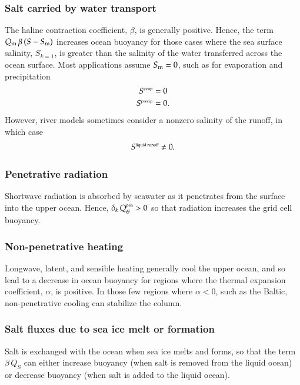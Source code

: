 \subsubsection{Salt carried by water transport}

The haline contraction coefficient, $\beta$, is generally positive.
Hence, the term $Q_{\mbox{\scriptsize m}} \, \beta \, (S - S_{\mbox{\scriptsize m}})$ increases ocean buoyancy
for those cases where the sea surface salinity, $S_{k=1}$, is greater
than the salinity of the water transferred across the ocean surface.
Most applications assume $S_{\mbox{\scriptsize m}} = 0$, such as for evaporation and
precipitation
\begin{align}
 S^{\mbox{\tiny evap}} &= 0 
\\
 S^{\mbox{\tiny precip}} &= 0.
\end{align}
 However, river models sometimes consider a nonzero salinity of the
 runoff, in which case 
\begin{equation}
 S^{\mbox{\tiny liquid runoff}} \ne 0. 
\end{equation}


\subsubsection{Penetrative radiation}

Shortwave radiation is absorbed by seawater as it penetrates from the
surface into the upper ocean. Hence, $\delta_{k} \,
Q_{\theta}^{\mbox{\tiny pen}} > 0$ so that radiation increases the
grid cell buoyancy.


\subsubsection{Non-penetrative heating}

Longwave, latent, and sensible heating generally cool the upper ocean,
and so lead to a decrease in ocean buoyancy for regions where the
thermal expansion coefficient, $\alpha$, is positive.  In those few
regions where $\alpha < 0$, such as the Baltic, non-penetrative
cooling can stabilize the column.


\subsubsection{Salt fluxes due to sea ice melt or formation}

Salt is exchanged with the ocean when sea ice melts and forms, so that
the term $\beta \, Q_{S}$ can either increase buoyancy (when salt is
removed from the liquid ocean) or decrease buoyancy (when salt is
added to the liquid ocean).


